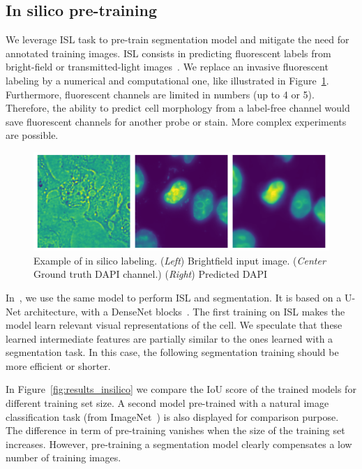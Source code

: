 \subsection{In silico pre-training}
\label{subsec:segmentation_insilico}

We leverage \ac{ISL} task to pre-train segmentation model and mitigate the need for annotated training images.
\ac{ISL} consists in predicting fluorescent labels from bright-field or transmitted-light images~\cite{christiansen_silico_2018, ounkomol_label_free_2018}.
We replace an invasive fluorescent labeling by a numerical and computational one, like illustrated in Figure~\ref{fig:example_insilico}.
Furthermore, fluorescent channels are limited in numbers (up to 4 or 5).
Therefore, the ability to predict cell morphology from a label-free channel would save fluorescent channels for another probe or stain.
More complex experiments are possible.

\begin{figure}[]
    \centering
    \includegraphics[width=\textwidth]{figures/chapter3/insilico_prediction}
    \caption[Example of in silico labeling]{Example of in silico labeling.
	(\textit{Left}) Brightfield input image.
	(\textit{Center} Ground truth DAPI channel.)
	(\textit{Right}) Predicted DAPI}
    \label{fig:example_insilico}
\end{figure}

In~\cite{anonymous_Bonte_2022}, we use the same model to perform \ac{ISL} and segmentation.
It is based on a U-Net architecture, with a DenseNet blocks~\cite{Huang_2017_CVPR}.
The first training on \ac{ISL} makes the model learn relevant visual representations of the cell.
We speculate that these learned intermediate features are partially similar to the ones learned with a segmentation task.
In this case, the following segmentation training should be more efficient or shorter.

In Figure~\ref{fig:results_insilico} we compare the \ac{IoU} score of the trained models for different training set size.
A second model pre-trained with a natural image classification task (from ImageNet~\cite{Deng_2009}) is also displayed for comparison purpose.
The difference in term of pre-training vanishes when the size of the training set increases.
However, pre-training a segmentation model clearly compensates a low number of training images.

